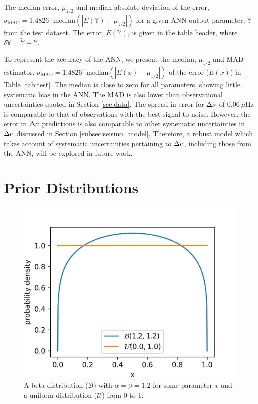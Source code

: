 \begin{table}
	\centering
	\caption[The median error and median absolute deviation of the error for each ANN output parameter from the test dataset.]{The median error, $\mu_{1/2}$ and median absolute deviation of the error, $\sigma_\mathrm{MAD} = 1.4826\cdot\mathrm{median}(|E(\mathbb{Y}) - \mu_{1/2}|)$ for a given ANN output parameter, $\mathbb{Y}$ from the test dataset. The error, $E(\mathbb{Y})$, is given in the table header, where $\delta \mathbb{Y} = \widetilde{\mathbb{Y}} - \mathbb{Y}$.}
	\label{tab:test}
        
\end{table}

To represent the accuracy of the ANN, we present the median, $\mu_{1/2}$ and MAD estimator, $\sigma_\mathrm{MAD} = 1.4826\cdot\mathrm{median}(|E(x) - \mu_{1/2}|)$ of the error ($E(x)$) in Table \ref{tab:test}. The median is close to zero for all parameters, showing little systematic bias in the ANN. The MAD is also lower than observational uncertainties quoted in Section \ref{sec:data}. The spread in error for ${\Delta\nu}$ of $\SI{0.06}{\mu\Hz}$ is comparable to that of observations with the best signal-to-noise. However, the error in ${\Delta\nu}$ predictions is also comparable to other systematic uncertainties in ${\Delta\nu}$ discussed in Section \ref{subsec:seismo_model}. Therefore, a robust model which takes account of systematic uncertainties pertaining to ${\Delta\nu}$, including those from the ANN, will be explored in future work.

\section{Prior Distributions}\label{sec:beta}

\begin{figure}[tb]
    \centering
    \includegraphics{figures/beta_distribution.png}
    \caption[A beta distribution compared to a uniform distribution.]{A beta distribution ($\mathcal{B}$) with $\alpha = \beta = 1.2$ for some parameter $x$ and a uniform distribution ($\mathcal{U}$) from 0 to 1.}
    \label{fig:beta}
\end{figure}

